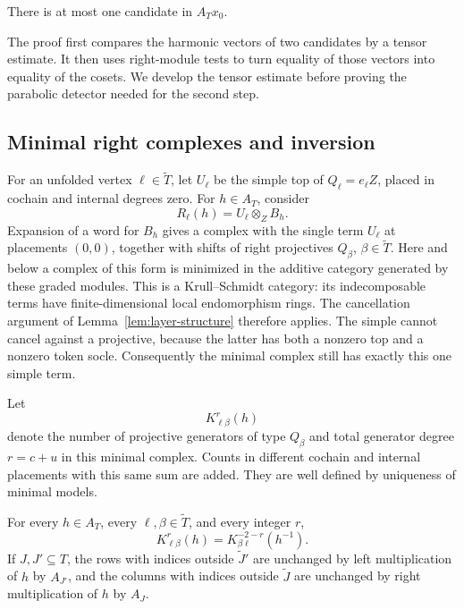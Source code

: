 \begin{proposition}
\label{prop:candidate-uniqueness}
There is at most one candidate in \(A_Tx_0\).
\end{proposition}

The proof first compares the harmonic vectors of two candidates by a
tensor estimate.  It then uses right-module tests to turn equality of
those vectors into equality of the cosets.  We develop the tensor
estimate before proving the parabolic detector needed for the second
step.

\subsection{Minimal right complexes and inversion}

For an unfolded vertex \(\ell\in\widetilde T\), let \(U_\ell\) be the
simple top of \(Q_\ell=e_\ell Z\), placed in cochain and internal
degrees zero.  For \(h\in A_T\), consider
\begin{equation}
\label{eq:two-point-right-complex}
 R_\ell(h)=U_\ell\otimes_Z B_h.
\end{equation}
Expansion of a word for \(B_h\) gives a complex with the single term
\(U_\ell\) at placements \((0,0)\), together with shifts of right
projectives \(Q_\beta\), \(\beta\in\widetilde T\).  Here and below a
complex of this form is minimized in the additive category generated
by these graded modules.  This is a Krull--Schmidt category: its
indecomposable terms have finite-dimensional local endomorphism rings.
The cancellation argument of Lemma~\ref{lem:layer-structure} therefore
applies.  The simple cannot cancel against a projective, because the
latter has both a nonzero top and a nonzero token socle.  Consequently
the minimal complex still has exactly this one simple term.

Let
\[
 K^r_{\ell\beta}(h)
\]
denote the number of projective generators of type \(Q_\beta\) and
total generator degree \(r=c+u\) in this minimal complex.  Counts in
different cochain and internal placements with this same sum are
added.  They are well defined by uniqueness of minimal models.

\begin{lemma}
\label{lem:right-duality}
For every \(h\in A_T\), every \(\ell,\beta\in\widetilde T\), and every
integer \(r\),
\begin{equation}
\label{eq:two-point-duality}
 K^r_{\ell\beta}(h)
   =K^{-2-r}_{\beta\ell}(h^{-1}).
\end{equation}
If \(J,J'\subseteq T\), the rows with indices outside
\(\widetilde J'\) are unchanged by left multiplication of \(h\) by
\(A_{J'}\), and the columns with indices outside \(\widetilde J\) are
unchanged by right multiplication of \(h\) by \(A_J\).
\end{lemma}

